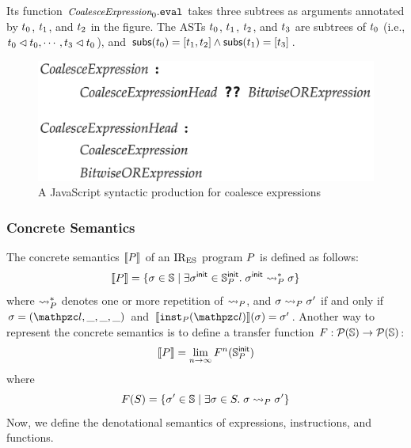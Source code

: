 \noindent Its  function $\textit{\small CoalesceExpression}_0.\texttt{eval}$
takes three subtrees as arguments annotated by $t_0$, $t_1$, and
$t_2$ in the figure. The ASTs $t_0$, $t_1$, $t_2$, and $t_3$
are subtrees of $t_0$ (i.e., $t_0 \lhd t_0, \cdots, t_3
\lhd t_0$), and $\textsf{subs}(t_0) = [t_1, t_2] \wedge
\textsf{subs}(t_1) = [t_3]$.


\begin{figure}
  \centering
  \includegraphics[width=.8\columnwidth]{img/coalesce-prod.png}
  \caption{A JavaScript syntactic production for coalesce expressions}
  \label{fig:coalesce-prod}
\end{figure}




\subsubsection{Concrete Semantics}

The concrete semantics $\llbracket{P}\rrbracket$ of an $\text{IR}_\text{ES}$ program $P$ is defined as
follows:
\[
  \llbracket{P}\rrbracket = \{ \sigma \in \mathbb{S} \mid \exists \sigma^{\textsf{init}} \in \mathbb{S}^{\textsf{init}}_{P}. \;
  \sigma^{\textsf{init}} \leadsto_{P}^* \sigma \}
\]
where $\leadsto_{P}^*$ denotes one or more repetition of $\leadsto_{P}$, and
$\sigma \leadsto_{P} \sigma'$ if and only if $\st = (\lab, \_, \_, \_)$ and
$\sem{\getinst{\prog}(\lab)}(\st) = \st'$. Another way to represent the concrete
semantics is to define a transfer function $F: \mathcal{P}(\mathbb{S})
\rightarrow \mathcal{P}(\mathbb{S})$:
\[
  \llbracket{P}\rrbracket = \lim_{n \rightarrow \infty}F^n(\mathbb{S}^{\textsf{init}}_{P})
\]
where
\begin{equation}\label{eqn:transfer}
  F(S) = \{ \sigma' \in \mathbb{S} \mid \exists \sigma \in S. \; \sigma \leadsto_{P}
  \sigma' \}
\end{equation}
Now, we define the denotational semantics of expressions, instructions, and
functions.

